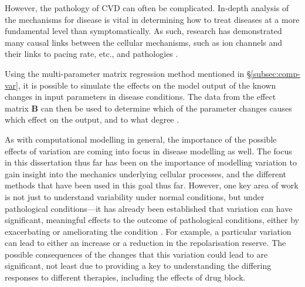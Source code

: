 \documentclass[../thesis-main.tex]{subfiles}
\begin{document}
However, the pathology of CVD can often be complicated. In-depth analysis of the mechanisms for disease is vital in determining how to treat diseases at a more fundamental level than symptomatically. As such, research has demonstrated many causal links between the cellular mechanisms, such as ion channels and their links to pacing rate, etc., and pathologies \citep{Inoue2006a, Kurz1993, Rodriguez2006, Dumaine1996, Nattel2010, Jurkat-Rott2005, Biagetti2006}.

Using the multi-parameter matrix regression method mentioned in \S\ref{subsec:comp-var}, it is possible to simulate the effects on the model output of the known changes in input parameters in disease conditions. The data from the effect matrix $\mathbf{B}$ can then be used to determine which of the parameter changes causes which effect on the output, and to what degree \citep{Sarkar2012}.

As with computational modelling in general, the importance of the possible effects of variation are coming into focus in disease modelling as well. The focus in this dissertation thus far has been on the importance of modelling variation to gain insight into the mechanics underlying cellular processes, and the different methods that have been used in this goal thus far. However, one key area of work is not just to understand variability under normal conditions, but under pathological conditions---it has already been established that variation can have significant, meaningful effects to the outcome of pathological conditions, either by exacerbating or ameliorating the condition \citep{Sarkar2012, John2012}. For example, a particular variation can lead to either an increase or a reduction in the repolarisation reserve. The possible consequences of the changes that this variation could lead to are significant, not least due to providing a key to understanding the differing responses to different therapies, including the effects of drug block.
\end{document}

